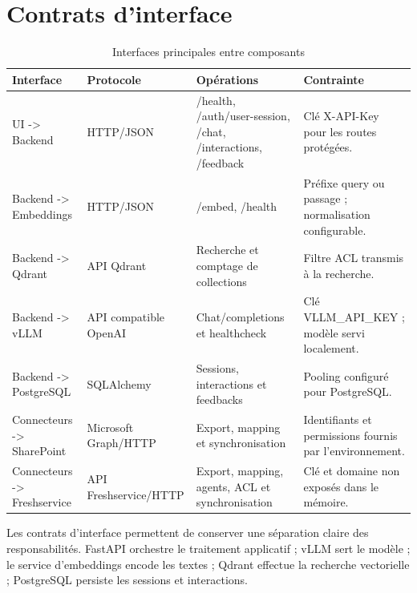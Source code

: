 \section{Contrats d'interface}

\begin{table}[H]
\centering
\caption{Interfaces principales entre composants}
\label{tab:interfaces_ch4}
\begin{tabular}{p{3cm}p{2.2cm}p{4.3cm}p{4.4cm}}
\toprule
\textbf{Interface} & \textbf{Protocole} & \textbf{Opérations} & \textbf{Contrainte} \\
\midrule
UI -> Backend & HTTP/JSON & /health, /auth/user-session, /chat, /interactions, /feedback & Clé X-API-Key pour les routes protégées. \\
Backend -> Embeddings & HTTP/JSON & /embed, /health & Préfixe query ou passage ; normalisation configurable. \\
Backend -> Qdrant & API Qdrant & Recherche et comptage de collections & Filtre ACL transmis à la recherche. \\
Backend -> vLLM & API compatible OpenAI & Chat/completions et healthcheck & Clé VLLM\_API\_KEY ; modèle servi localement. \\
Backend -> PostgreSQL & SQLAlchemy & Sessions, interactions et feedbacks & Pooling configuré pour PostgreSQL. \\
Connecteurs -> SharePoint & Microsoft Graph/HTTP & Export, mapping et synchronisation & Identifiants et permissions fournis par l'environnement. \\
Connecteurs -> Freshservice & API Freshservice/HTTP & Export, mapping, agents, ACL et synchronisation & Clé et domaine non exposés dans le mémoire. \\
\bottomrule
\end{tabular}
\end{table}

Les contrats d'interface permettent de conserver une séparation claire des responsabilités. FastAPI orchestre le traitement applicatif ; vLLM sert le modèle ; le service d'embeddings encode les textes ; Qdrant effectue la recherche vectorielle ; PostgreSQL persiste les sessions et interactions.
